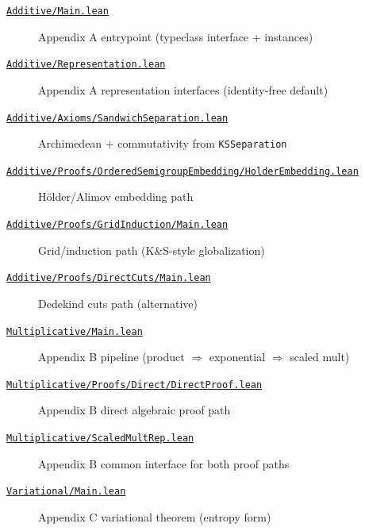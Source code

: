 \documentclass[11pt]{article}
\theoremstyle{definition}
\theoremstyle{remark}
\begin{document}
\begin{description}
\medskip
\item[\href{https://github.com/zariuq/ks-foundations-of-inference/blob/main/KnuthSkilling/Additive/Main.lean}{\texttt{Additive/Main.lean}}] Appendix A entrypoint (typeclass interface + instances)
\item[\href{https://github.com/zariuq/ks-foundations-of-inference/blob/main/KnuthSkilling/Additive/Representation.lean}{\texttt{Additive/Representation.lean}}] Appendix A representation interfaces (identity-free default)
\item[\href{https://github.com/zariuq/ks-foundations-of-inference/blob/main/KnuthSkilling/Additive/Axioms/SandwichSeparation.lean}{\texttt{Additive/Axioms/SandwichSeparation.lean}}] Archimedean + commutativity from \texttt{KSSeparation}
\item[\href{https://github.com/zariuq/ks-foundations-of-inference/blob/main/KnuthSkilling/Additive/Proofs/OrderedSemigroupEmbedding/HolderEmbedding.lean}{\texttt{Additive/Proofs/OrderedSemigroupEmbedding/HolderEmbedding.lean}}] Hölder/Alimov embedding path
\item[\href{https://github.com/zariuq/ks-foundations-of-inference/blob/main/KnuthSkilling/Additive/Proofs/GridInduction/Main.lean}{\texttt{Additive/Proofs/GridInduction/Main.lean}}] Grid/induction path (K\&S-style globalization)
\item[\href{https://github.com/zariuq/ks-foundations-of-inference/blob/main/KnuthSkilling/Additive/Proofs/DirectCuts/Main.lean}{\texttt{Additive/Proofs/DirectCuts/Main.lean}}] Dedekind cuts path (alternative)

\medskip
\item[\href{https://github.com/zariuq/ks-foundations-of-inference/blob/main/KnuthSkilling/Multiplicative/Main.lean}{\texttt{Multiplicative/Main.lean}}] Appendix B pipeline (product $\Rightarrow$ exponential $\Rightarrow$ scaled mult)
\item[\href{https://github.com/zariuq/ks-foundations-of-inference/blob/main/KnuthSkilling/Multiplicative/Proofs/Direct/DirectProof.lean}{\texttt{Multiplicative/Proofs/Direct/DirectProof.lean}}] Appendix B direct algebraic proof path
\item[\href{https://github.com/zariuq/ks-foundations-of-inference/blob/main/KnuthSkilling/Multiplicative/ScaledMultRep.lean}{\texttt{Multiplicative/ScaledMultRep.lean}}] Appendix B common interface for both proof paths

\medskip
\item[\href{https://github.com/zariuq/ks-foundations-of-inference/blob/main/KnuthSkilling/Variational/Main.lean}{\texttt{Variational/Main.lean}}] Appendix C variational theorem (entropy form)


\end{description}
\end{document}
